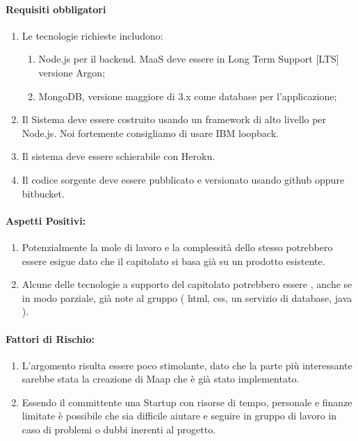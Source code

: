 \documentclass[12pt,a4paper]{article}
\begin{document}
\paragraph{Requisiti obbligatori}
\begin{enumerate}




\item	Le tecnologie richieste includono:

\begin{enumerate}



\item Node.js per il backend. MaaS deve essere in Long Term Support [LTS] versione Argon;

\item	MongoDB, versione maggiore di 3.x come database per l'applicazione; 

\end{enumerate}

\item Il Sistema deve essere costruito usando un framework di alto livello per Node.js. Noi fortemente consigliamo di usare IBM loopback.

\item Il sistema deve essere schierabile con Heroku.
 
\item	Il codice sorgente deve essere pubblicato e versionato   usando github oppure bitbucket. 
\end{enumerate}
\paragraph{Aspetti Positivi:}
\begin{enumerate}


\item	Potenzialmente la mole di lavoro e la complessità dello stesso potrebbero essere esigue dato che il capitolato si basa già su un prodotto esistente.

\item	Alcune delle tecnologie a supporto del capitolato potrebbero essere , anche se in modo parziale, già note al gruppo ( html, css, un servizio di	database, java ).
\end{enumerate}
\paragraph{Fattori di Rischio:}
	\begin{enumerate}
\item	L'argomento risulta essere poco stimolante, dato che la parte più interessante sarebbe stata la creazione di Maap che è già stato implementato.

\item	Essendo il committente una Startup con risorse di tempo, personale e	finanze limitate è possibile che sia difficile aiutare e seguire in	gruppo di lavoro in caso di problemi o dubbi inerenti al progetto.
\end{enumerate}
\end{document}
